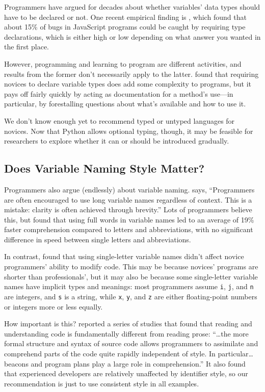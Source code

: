 Programmers have argued for decades about whether variables' data
types should have to be declared or not.  One recent empirical finding
is \cite{Gao2017}, which found that about 15\% of bugs in JavaScript
programs could be caught by requiring type declarations, which is
either high or low depending on what answer you wanted in the first
place.

However, programming and learning to program are different activities,
and results from the former don't necessarily apply to the latter.
\cite{Endr2014} found that requiring novices to declare variable types
does add some complexity to programs, but it pays off fairly quickly
by acting as documentation for a method's use---in particular, by
forestalling questions about what's available and how to use it.

We don't know enough yet to recommend typed or untyped languages for
novices.  Now that Python allows optional typing, though, it may be
feasible for researchers to explore whether it can or should be
introduced gradually.

\subsection*{Does Variable Naming Style Matter?}

Programmers also argue (endlessly) about variable naming.
\cite{Kern1999} says, ``Programmers are often encouraged to use long
variable names regardless of context. This is a mistake: clarity is
often achieved through brevity.''  Lots of programmers believe this,
but \cite{Hofm2017} found that using full words in variable names led
to an average of 19\% faster comprehension compared to letters and
abbreviations, with no significant difference in speed between single
letters and abbreviations.

In contrast, \cite{Beni2017} found that using single-letter variable
names didn't affect novice programmers' ability to modify code.  This
may be because novices' programs are shorter than professionals', but
it may also be because some single-letter variable names have implicit
types and meanings: most programmers assume \texttt{i}, \texttt{j},
and \texttt{n} are integers, and \texttt{s} is a string, while
\texttt{x}, \texttt{y}, and \texttt{z} are either floating-point
numbers or integers more or less equally.

How important is this?  \cite{Bink2012} reported a series of studies
that found that reading and understanding code is fundamentally
different from reading prose: ``{\ldots}the more formal structure and
syntax of source code allows programmers to assimilate and comprehend
parts of the code quite rapidly independent of style.  In
particular{\ldots}beacons and program plans play a large role in
comprehension.''  It also found that experienced developers are
relatively unaffected by identifier style, so our recommendation is
just to use consistent style in all examples.

